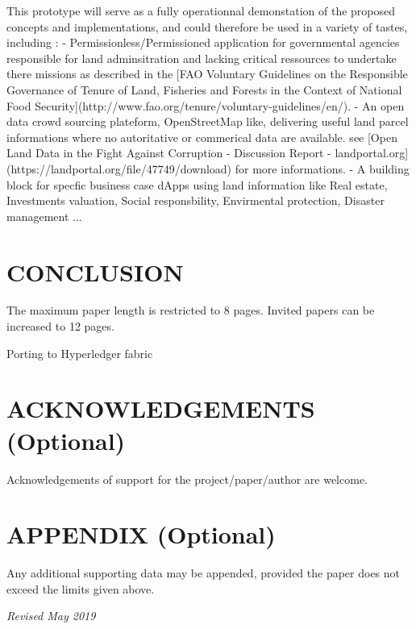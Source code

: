 \documentclass{isprs} %
\begin{document}
This prototype will serve as a fully operationnal demonstation of the proposed concepts and implementations, and could therefore be used in a variety of tastes, including :
- Permissionless/Permissioned application for governmental agencies responsible for land adminsitration and lacking critical ressources to undertake there missions as described in the [FAO Voluntary Guidelines on the Responsible Governance of Tenure of Land, Fisheries and Forests in the Context of National Food Security](http://www.fao.org/tenure/voluntary-guidelines/en/).
- An open data crowd sourcing plateform, OpenStreetMap like, delivering useful land parcel informations where no autoritative or commerical data are available. see [Open Land Data in the Fight Against Corruption - Discussion Report - landportal.org](https://landportal.org/file/47749/download) for more informations.
- A building block for specfic business case dApps using land information like Real estate, Investments valuation, Social responsbility, Envirmental protection, Disaster management ... 

\section{CONCLUSION}\label{sec:CONCLUSION}

The maximum paper length is restricted to 8 pages. Invited papers can be increased to 12 pages. 

Porting to Hyperledger fabric 


\section*{ACKNOWLEDGEMENTS (Optional)}\label{ACKNOWLEDGEMENTS}
Acknowledgements of support for the project/paper/author are welcome. 

{
	\begin{spacing}{1.17}
		\normalsize
	\end{spacing}
}


\section*{APPENDIX (Optional)}\label{APPENDIX}

Any additional supporting data may be appended, provided the paper does not exceed the limits given above. 

\vspace{1cm}
\textit{Revised May 2019}
\end{document}

